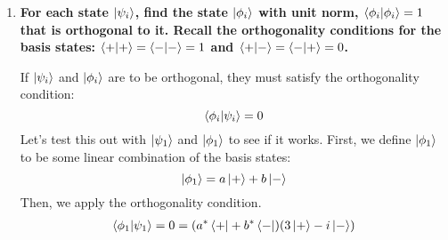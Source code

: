 \documentclass[11pt]{article}
\DeclareMathOperator\conj{conj}
\begin{document}
\begin{enumerate}[label=\textbf{\arabic*.}, start=2]
{\begin{enumerate}[label=\textbf{(\alph*)}]
{\begin{align*}
                        &=\frac{1}{\sqrt{106}}\left(7e^{i\pi/6}-2\right)
                    \end{align*}
                    \(i=3\), \(j=1\):
                    \begin{align*}
                        \prescript{}{\mathrm{N}}{\braket{\psi_3|\psi_1}_\mathrm{N}}&=\prescript{*}{\mathrm{N}}{\braket{\psi_1|\psi_3}_\mathrm{N}^*} \\
                        &=\conj\left(\tfrac{19i}{\sqrt{530}}\right) \\
                        &=-\frac{19i}{\sqrt{530}}
                    \end{align*}
                    \(i=3\), \(j=2\):
                    \begin{align*}
                        \prescript{}{\mathrm{N}}{\braket{\psi_3|\psi_2}_\mathrm{N}}&=\prescript{*}{\mathrm{N}}{\braket{\psi_2|\psi_3}_\mathrm{N}^*} \\
                        &=\conj\left(\frac{1}{\sqrt{106}}\left(7e^{i\pi/6}-2\right)\right) \\
                        &=\frac{1}{\sqrt{106}}\left(7e^{-i\pi/6}-2\right)
                    \end{align*}
                    \(i=3\), \(j=3\):
                    \begin{align*}
                        \prescript{}{\mathrm{N}}{\braket{\psi_3|\psi_3}_\mathrm{N}}&=1\quad\text{(by definition)}
                    \end{align*}
                }
                \item{
                    \textbf{\boldmath For each state \(\ket{\psi_i}\), find the state \(\ket{\phi_i}\) with unit norm, \(\braket{\phi_i|\phi_i}=1\) that is orthogonal to it. Recall the orthogonality conditions for the basis states: \(\braket{+|+}=\braket{-|-}=1\) and \(\braket{+|-}=\braket{-|+}=0\).}
                    \par
                    If \(\ket{\psi_i}\) and \(\ket{\phi_i}\) are to be orthogonal, they must satisfy the orthogonality condition:
                    \[\braket{\phi_i|\psi_i}=0\]
                    Let's test this out with \(\ket{\psi_1}\) and \(\ket{\phi_1}\) to see if it works. First, we define \(\ket{\phi_1}\) to be some linear combination of the basis states:
                    \[\ket{\phi_1}=a\ket{+}+b\ket{-}\]
                    Then, we apply the orthogonality condition.
                    \begin{align*}
                        \braket{\phi_1|\psi_1}=0&=(a^*\bra{+}+b^*\bra{-})(3\ket{+}-i\ket{-}) \\

\end{align*}}
\end{enumerate}}
\end{enumerate}
\end{document}

